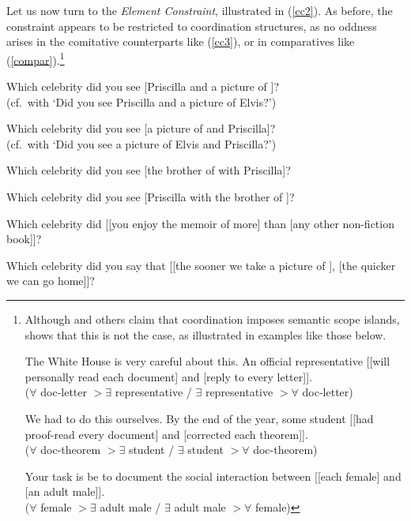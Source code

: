 \documentclass[output=paper]{langsci/langscibook}
\begin{document}
Let us now turn to the \emph{Element Constraint},  illustrated in (\ref{cc2}). As before, the constraint appears to be restricted to coordination structures, as no  oddness arises in the comitative counterparts like  (\ref{cc3}), or in comparatives like (\ref{compar}).\footnote{Although \citet[83]{winter01} and others claim that coordination imposes semantic scope islands, \citet[3.6]{chavesthesis} shows that this is not the case, as illustrated in examples like those below.

\eal
\ex The White House is very careful about this. An official representative [[will
              personally read each document] and [reply to every letter]].\\
              ($\forall$ doc-letter $>$$\exists$ representative / $\exists$ representative $>$$\forall$ doc-letter)

\ex We had to do this ourselves. By the end of the year,
some student [[had proof-read every document] and [corrected each
theorem]].\\
($\forall$  doc-theorem $>$$\exists$ student / $\exists$ student $>$$\forall$ doc-theorem)

\ex Your task is be to document the social interaction
between [[each female] and [an adult male]].\\
($\forall$ female $>$$\exists$ adult male / $\exists$ adult male $>$$\forall$ female)
\zllast
}


 

\ea \label{cc2}
\ea  \bad{*}Which celebrity did you see [Priscilla and a picture of \spc]?\\
(cf.\ with `Did you see Priscilla and a picture of Elvis?')
\item \bad{*}Which celebrity did you see [a picture of \spc and Priscilla]?\\
(cf.\ with `Did you see a picture of Elvis and Priscilla?')
\z 
\z

\ea 
\ea Which celebrity did you see [the brother of \spc with Priscilla]?
\item Which celebrity did you see [Priscilla with the brother of \spc]?
\z \label{cc3} 
\z

\ea 
\ea Which celebrity did  [[you enjoy the memoir of \spcs more] than
                                 [any other non-fiction book]]?

\item Which celebrity did you say that [[the sooner we take a picture of \spc ],
[the quicker we can go home]]?
\z \label{compar} 
\z
\end{document}
